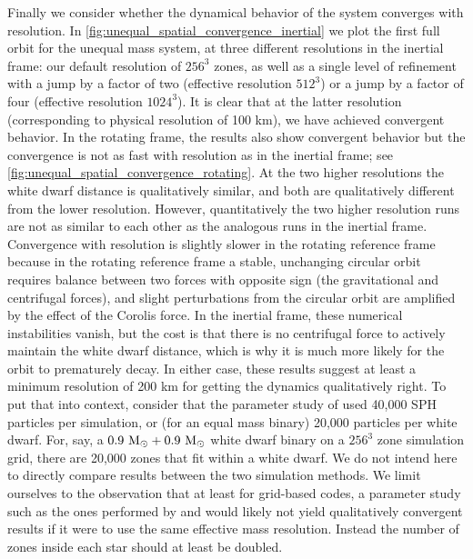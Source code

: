 \documentclass[12pt]{article}
\begin{document}
Finally we consider whether the dynamical behavior of the system converges with resolution. 
In \autoref{fig:unequal_spatial_convergence_inertial} we plot the first full orbit for 
the unequal mass system, at three different resolutions in the inertial frame: our default 
resolution of $256^3$ zones, as well as a single level of refinement with a jump by a factor of 
two (effective resolution $512^3$) or a jump by a factor of four (effective resolution $1024^3$). 
It is clear that at the latter resolution (corresponding to physical resolution of 100 km), 
we have achieved convergent behavior. In the rotating frame, the results also show
convergent behavior but the convergence is not as fast with resolution as in the inertial frame; 
see \autoref{fig:unequal_spatial_convergence_rotating}. At the two higher resolutions the white dwarf
distance is qualitatively similar, and both are qualitatively different from the lower resolution. However,
quantitatively the two higher resolution runs are not as similar to each other as the analogous runs in the
inertial frame. Convergence with resolution is slightly slower in the rotating reference frame
because in the rotating reference frame a stable, unchanging circular orbit requires balance between
two forces with opposite sign (the gravitational and centrifugal forces), and slight perturbations from the
circular orbit are amplified by the effect of the Corolis force. In the inertial frame, these numerical instabilities
vanish, but the cost is that there is no centrifugal force to actively maintain the white dwarf distance,
which is why it is much more likely for the orbit to prematurely decay. In either case, these results suggest
at least a minimum resolution of 200 km for getting the dynamics qualitatively right. To put that into context,
consider that the parameter study of \citet{dan:2014} used 40,000 SPH particles per simulation, or (for an equal mass
binary) 20,000 particles per white dwarf. For, say, a $0.9\ \mathrm{M}_\odot + 0.9\ \mathrm{M}_\odot$ white dwarf binary on
a $256^3$ zone simulation grid, there are 20,000 zones that fit within a white dwarf. We do not
intend here to directly compare results between the two simulation methods. We limit ourselves to the
observation that at least for grid-based codes, a parameter study such as the ones performed by
\citet{dan:2012} and \citet{dan:2014} would likely not yield qualitatively convergent results if it were to use the
same effective mass resolution. Instead the number of zones inside each star should at least be doubled.
\end{document}
